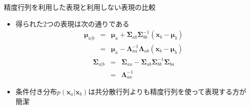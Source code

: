 \begin{frame}{精度行列を利用した表現と利用しない表現の比較}
 \begin{itemize}
  \item 得られた2つの表現は次の通りである
        \begin{eqnarray*}
         \bm{\mu}_{a|b} &=& \bm{\mu}_a + \bm{\Sigma}_{ab}\bm{\Sigma}_{bb}^{-1}(\bm{x}_b-\bm{\mu}_b)\\
         &=& \bm{\mu}_a-\bm{\Lambda}_{aa}^{-1}\bm{\Lambda}_{ab}(\bm{x}_b-\bm{\mu}_b)
        \end{eqnarray*}
        \begin{eqnarray*}
         \bm{\Sigma}_{a|b} &=& \bm{\Sigma}_{aa} - \bm{\Sigma}_{ab}\bm{\Sigma}_{bb}^{-1}\bm{\Sigma}_{ba} \\
         & =& \bm{\Lambda}_{aa}^{-1}
        \end{eqnarray*}
  \item 条件付き分布$p(\bm{x}_a|\bm{x}_b)$は共分散行列よりも精度行列を使って表現する方が簡潔
 \end{itemize}
\end{frame}
